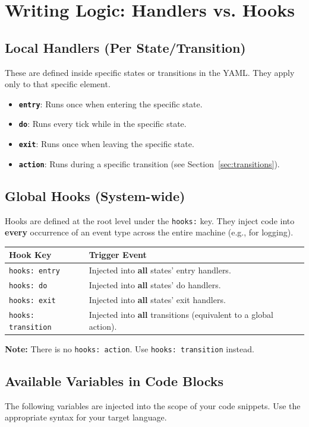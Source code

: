 \documentclass[a4paper,11pt]{article}
\begin{document}
\section{Writing Logic: Handlers vs. Hooks}

\subsection{Local Handlers (Per State/Transition)}
These are defined inside specific states or transitions in the YAML. They apply only to that specific element.

\begin{itemize}
    \item \textbf{\texttt{entry}}: Runs once when entering the specific state.
    \item \textbf{\texttt{do}}: Runs every tick while in the specific state.
    \item \textbf{\texttt{exit}}: Runs once when leaving the specific state.
    \item \textbf{\texttt{action}}: Runs during a specific transition (see Section~\ref{sec:transitions}).
\end{itemize}

\subsection{Global Hooks (System-wide)}
Hooks are defined at the root level under the \texttt{hooks:} key. They inject code into \textbf{every} occurrence of an event type across the entire machine (e.g., for logging).

\begin{longtable}{@{}lp{10cm}@{}}
\toprule
\textbf{Hook Key} & \textbf{Trigger Event} \\
\midrule
\endhead
\texttt{hooks: entry} & Injected into \textbf{all} states' entry handlers. \\
\texttt{hooks: do} & Injected into \textbf{all} states' do handlers. \\
\texttt{hooks: exit} & Injected into \textbf{all} states' exit handlers. \\
\texttt{hooks: transition} & Injected into \textbf{all} transitions (equivalent to a global action). \\
\bottomrule
\end{longtable}

\textbf{Note:} There is no \texttt{hooks: action}. Use \texttt{hooks: transition} instead.

\subsection{Available Variables in Code Blocks}
The following variables are injected into the scope of your code snippets. Use the appropriate syntax for your target language.
\end{document}
